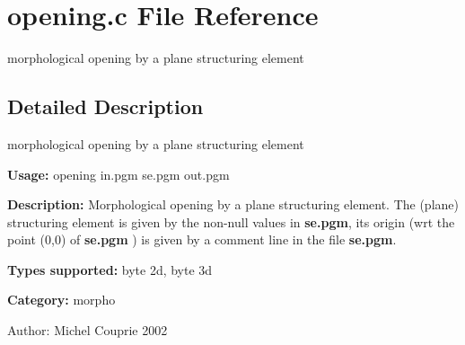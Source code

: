 \section{opening.c File Reference}
\label{opening_8c}
morphological opening by a plane structuring element 



\subsection{Detailed Description}
morphological opening by a plane structuring element 

{\bf Usage:} opening in.pgm se.pgm out.pgm

{\bf Description:} Morphological opening by a plane structuring element. The (plane) structuring element is given by the non-null values in {\bf se.pgm}, its origin (wrt the point (0,0) of {\bf se.pgm} ) is given by a comment line in the file {\bf se.pgm}.

{\bf Types supported:} byte 2d, byte 3d

{\bf Category:} morpho

\begin{Desc}
\item[Author:]Michel Couprie 2002 \end{Desc}
